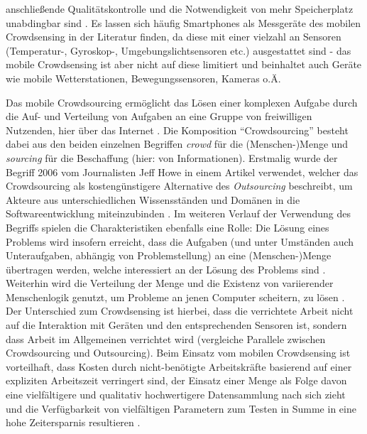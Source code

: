anschließende Qualitätskontrolle und die Notwendigkeit von mehr Speicherplatz unabdingbar sind \cite{Ray2022}. Es lassen sich häufig Smartphones als Messgeräte des mobilen Crowdsensing in der Literatur finden, da diese mit einer vielzahl an Sensoren (Temperatur-, Gyroskop-, Umgebungslichtsensoren etc.) ausgestattet sind - das mobile Crowdsensing ist aber nicht auf diese limitiert und beinhaltet auch Geräte wie mobile Wetterstationen, Bewegungssensoren, Kameras o.Ä. 

Das mobile Crowdsourcing ermöglicht das Lösen einer komplexen Aufgabe durch die Auf- und Verteilung von Aufgaben an eine Gruppe von freiwilligen Nutzenden, hier über das Internet \cite {Wang2019}. Die Komposition \enquote{Crowdsourcing} besteht dabei aus den beiden einzelnen Begriffen \textit{crowd} für die (Menschen-)Menge und \textit{sourcing} für die Beschaffung (hier: von Informationen). Erstmalig wurde der Begriff 2006 vom Journalisten Jeff Howe in einem Artikel verwendet, welcher das Crowdsourcing als kostengünstigere Alternative des \textit{Outsourcing} beschreibt, um Akteure aus unterschiedlichen Wissensständen und Domänen in die Softwareentwicklung miteinzubinden \cite{Howe2006}. Im weiteren Verlauf der Verwendung des Begriffs spielen die Charakteristiken ebenfalls eine Rolle: Die Lösung eines Problems wird insofern erreicht, dass die Aufgaben (und unter Umständen auch Unteraufgaben, abhängig von Problemstellung) an eine (Menschen-)Menge übertragen werden, welche interessiert an der Lösung des Problems sind \cite{Ray2022}. Weiterhin wird die Verteilung der Menge 
und die Existenz von variierender Menschenlogik genutzt, um Probleme an jenen Computer scheitern, zu lösen \cite{Ray2022}. Der Unterschied zum Crowdsensing ist hierbei, dass die verrichtete Arbeit nicht auf die Interaktion mit Geräten und den entsprechenden Sensoren ist, sondern dass Arbeit im Allgemeinen verrichtet wird (vergleiche Parallele zwischen Crowdsourcing und Outsourcing). Beim Einsatz vom mobilen Crowdsensing ist vorteilhaft, dass Kosten durch nicht-benötigte Arbeitskräfte basierend auf einer expliziten Arbeitszeit verringert sind, der Einsatz einer Menge als Folge davon eine vielfältigere und qualitativ hochwertigere Datensammlung nach sich zieht und die Verfügbarkeit von vielfältigen Parametern zum Testen in Summe in eine hohe Zeitersparnis resultieren \cite{Ray2022}.

